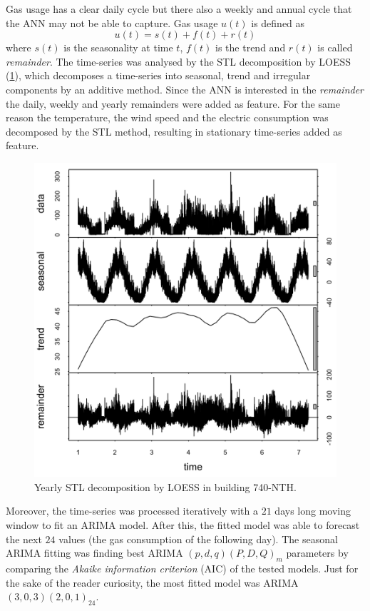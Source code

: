 \documentclass{sig-alternate-sigmod07}
\begin{document}
Gas usage has a clear daily cycle but there also a weekly and annual cycle that the ANN may not be able to capture. Gas usage $u(t)$ is defined as \begin{displaymath}u(t) = s(t) + f(t) + r(t)\end{displaymath} where $s(t)$ is the seasonality at time $t$, $f(t)$ is the trend and $r(t)$ is called \emph{remainder}. The time-series was analysed by the STL decomposition by LOESS \cite{cleveland1990stl}(\cref{fig:STL}), which decomposes a time-series into seasonal, trend and irregular components by an additive method. Since the ANN is interested in the \emph{remainder} the daily, weekly and yearly remainders were added as feature. For the same reason the temperature, the wind speed and the electric consumption was decomposed by the STL method, resulting in stationary time-series added as feature.

\begin{figure}
\centering
\includegraphics[width=\columnwidth]{STL.png}
\caption{Yearly STL decomposition by LOESS in building 740-NTH.}
\label{fig:STL}
\end{figure}

Moreover, the time-series was processed iteratively with a $21$ days long moving window to fit an ARIMA model. After this, the fitted model was able to forecast the next $24$ values (the gas consumption of the following day). The seasonal ARIMA fitting was finding best ARIMA $(p,d,q) (P,D,Q)_m$ parameters by comparing the \emph{Akaike information criterion} (AIC) of the tested models. Just for the sake of the reader curiosity, the most fitted model was ARIMA $(3,0,3) (2,0,1)_{24}$.
\end{document}
